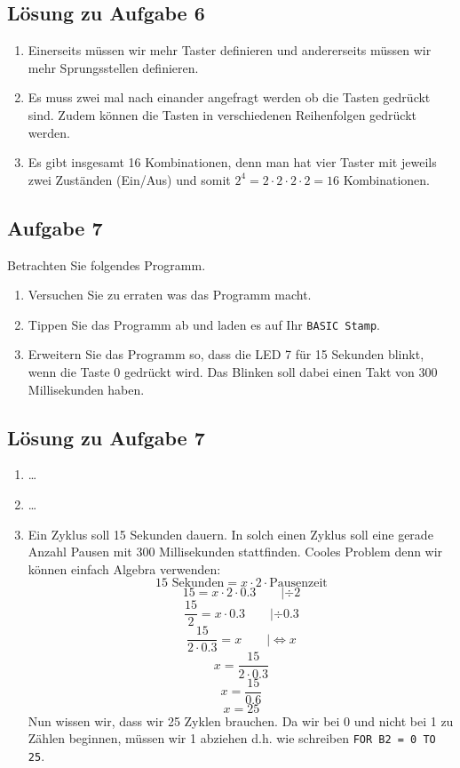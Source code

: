 \subsection{Lösung zu Aufgabe 6}
\begin{enumerate}[label=(\alph*)]
	\item Einerseits müssen wir mehr Taster definieren und andererseits
	müssen wir mehr Sprungsstellen definieren.
	
	\item Es muss zwei mal nach einander angefragt werden ob die Tasten
	gedrückt sind. Zudem können die Tasten in verschiedenen Reihenfolgen
	gedrückt werden.
	
	\item Es gibt insgesamt 16 Kombinationen, denn man hat vier Taster
	mit jeweils zwei Zuständen (Ein/Aus) und somit 
	$2^4=2 \cdot 2 \cdot 2 \cdot 2=16$
	Kombinationen.
\end{enumerate}
\fi

\newpage
\subsection{Aufgabe 7}\label{timing-problem}
Betrachten Sie folgendes Programm.


\begin{enumerate}[label=(\alph*)]
\item Versuchen Sie zu erraten was das Programm macht.
\item Tippen Sie das Programm ab und laden es auf Ihr \lstinline{BASIC Stamp}.
\item Erweitern Sie das Programm so, dass die LED 7 für 15 Sekunden blinkt, wenn die 
Taste 0 gedrückt wird. Das Blinken soll dabei einen Takt von 300 Millisekunden haben.
\end{enumerate}

\ifteacher
\newpage
\subsection{Lösung zu Aufgabe 7}
\begin{enumerate}[label=(\alph*)]
\item \dots
\item \dots 
\item Ein Zyklus soll 15 Sekunden dauern. In solch einen Zyklus soll eine gerade
Anzahl Pausen mit 300 Millisekunden stattfinden. Cooles Problem denn wir können 
einfach Algebra verwenden:
\[  \text{15 Sekunden} = x \cdot 2 \cdot \text{Pausenzeit} \]
\[  15 = x \cdot 2 \cdot 0.3 \qquad |\div 2 \]
\[  \frac{15}{2} = x \cdot 0.3 \qquad |\div 0.3 \]
\[ \frac{15}{2 \cdot 0.3} = x  \qquad |\Leftrightarrow x \]
\[ x = \frac{15}{2 \cdot 0.3} \]
\[ x = \frac{15}{0.6} \]
\[ x = 25 \]
Nun wissen wir, dass wir 25 Zyklen brauchen. Da wir bei 0 und nicht bei 1 zu Zählen 
beginnen, müssen wir 1 abziehen d.h. wie schreiben \lstinline{FOR B2 = 0 TO 25}.

\end{enumerate}
\fi

